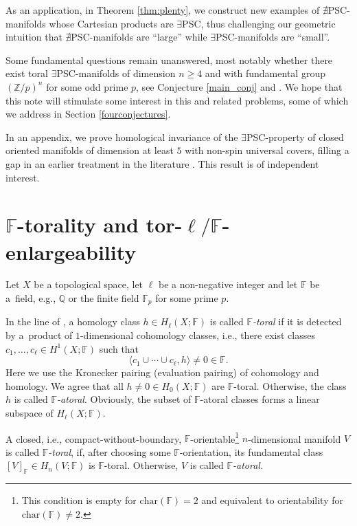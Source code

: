 \documentclass[pdftex]{sigma}
\numberwithin{equation}{section}
\newcommand{\F}{\mathbb{F}}
\newcommand{\Z}{\mathbb{Z}}
\newcommand{\charac}{\mathrm{char}}
\newcommand{\no}{{\color{brown!70!black}$\nexists$}{\sf PSC}}
\newcommand{\yes}{{\color {blue!70!black}$\exists$}{\sf PSC}}
\begin{document}
As an application, in Theorem \ref{thm:plenty}, we construct new examples of \no-manifolds whose Cartesian products are \yes, thus challenging our geometric intuition that \no-manifolds are ``large'' while \yes-manifolds are ``small''.


Some fundamental questions remain unanswered, most notably whether there exist toral \yes-manifolds of dimension $n \geq 4$ and with fundamental group $(\Z/p)^n$ for some odd prime $p$, see Conjecture \ref{main_conj} and \cite[Problem 9]{MP2021}.
We hope that this note will stimulate some interest in this and related problems, some of which we address in Section \ref{fourconjectures}.

In an appendix, we prove homological invariance of the \yes-property of closed oriented manifolds of dimension at least $5$ with non-spin universal covers, filling a gap in an earlier treatment in the literature \cite{RS}.
This result is of independent interest.

\section[Torality and tor-enlargeability]{$\boldsymbol{\F}$-torality and tor-$\boldsymbol{\ell/\F}$-enlargeability}

\begin{Definition} \label{deftoral}
Let $X$ be a topological space, let $\ell$ be a non-negative integer and let $\mathbb{F}$ be a~field, e.g., $\mathbb{Q}$ or the finite field $\mathbb F_{p}$ for some prime $p$.

In the line of \cite{Han20,Jo2004}, a homology class $h \in H_\ell(X; \F)$ is called {\it $\mathbb F$-toral} if it is detected by a~product of $1$-dimensional cohomology classes, i.e., there exist classes $c_1, \ldots, c_\ell \in H^1(X ; \mathbb F)$ such that
\[
 \langle c_1\cup \cdots \cup c_\ell, h \rangle \neq 0 \in \F.
\]
Here we use the Kronecker pairing (evaluation pairing) of cohomology and homology.
We agree that all $h \neq 0 \in H_0(X; \F)$ are $\F$-toral.
Otherwise, the class $h$ is called {\it $\F$-atoral}.
Obviously, the subset of $\F$-atoral classes forms a linear subspace of $H_{\ell}(X; \F)$.

A closed, i.e., compact-without-boundary, $\F$-orientable\footnote{This condition is empty for $\charac(\F) = 2$ and equivalent to orientability for $\charac(\F) \neq 2$.} $n$-dimensional manifold $V$ is called {\it $\F$-toral}, if, after choosing some $\F$-orientation, its fundamental class $[V]_{\F} \in H_{n}(V; \F)$ is $\F$-toral.
Otherwise, $V$ is called {\it $\F$-atoral.}
\end{Definition}
\end{document}
